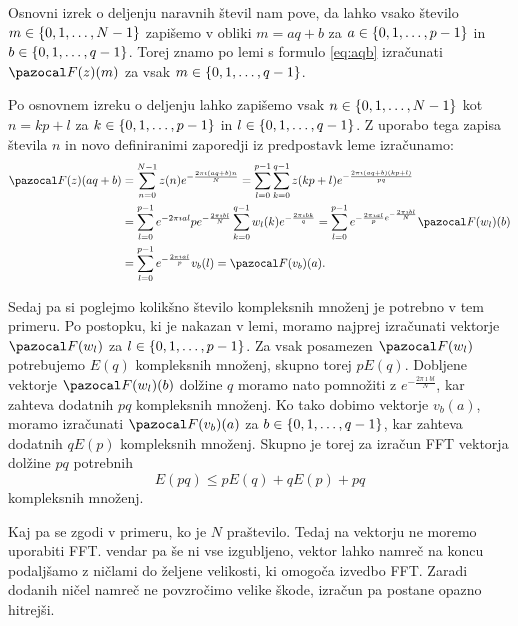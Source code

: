 %
\begin{dokaz}
%
Osnovni izrek o deljenju naravnih števil nam pove, da lahko vsako število $m \in \left\{0, 1, \ldots, N-1\right\}$ zapišemo v obliki $m = aq + b$ za $a \in \left\{0, 1, \ldots, p-1\right\}$ in $b \in \left\{0, 1, \ldots, q-1\right\}$. Torej znamo po lemi s formulo \eqref{eq:aqb} izračunati $\F(z)(m)$ za vsak $m \in \left\{0, 1, \ldots, q-1\right\}$.

Po osnovnem izreku o deljenju lahko zapišemo vsak $n \in \left\{0, 1, \ldots, N-1\right\}$ kot $n = kp + l$ za $k \in \left\{0, 1, \ldots, p-1\right\}$ in $l \in \left\{0, 1, \ldots, q-1\right\}$. Z uporabo tega zapisa števila $n$ in novo definiranimi zaporedji iz predpostavk leme izračunamo:
\begin{align*}
  \F(z)(aq + b) & = \sum_{n=0}^{N-1} z(n) e^{-\frac{2\pi\imath(aq + b)n}{N}} = \sum_{l=0}^{p-1} \sum_{k=0}^{q-1} z(kp + l)e^{-\frac{2\pi\imath(aq + b)(kp + l)}{pq}} \\
  & = \sum_{l=0}^{p-1} e^{-2\pi\imath al}{p} e^{-\frac{2\pi\imath bl}{N}} \sum_{k=0}^{q-1} w_l(k) e^{-\frac{2\pi\imath bk}{q}} = \sum_{l=0}^{p-1} e^{-\frac{2\pi\imath al}{p} e^{-\frac{2\pi\imath bl}{N}}} \F(w_l)(b) \\
  & = \sum_{l=0}^{p-1} e^{-\frac{2\pi\imath al}{p}} v_b(l) = \F(v_b)(a).
\end{align*}
\end{dokaz}
%
Sedaj pa si poglejmo kolikšno število kompleksnih množenj je potrebno v tem primeru. Po postopku, ki je nakazan v lemi, moramo najprej izračunati vektorje $\F(w_l)$ za $l \in \left\{0, 1, \ldots, p-1\right\}$. Za vsak posamezen $\F(w_l)$ potrebujemo $E(q)$ kompleksnih množenj, skupno torej $p E(q)$. Dobljene vektorje $\F(w_l)(b)$ dolžine $q$ moramo nato pomnožiti z $e^{-\frac{2\pi\imath bl}{N}}$, kar zahteva dodatnih $pq$ kompleksnih množenj. Ko tako dobimo vektorje $v_b(a)$, moramo izračunati $\F(v_b)(a)$ za $b \in \left\{0, 1, \ldots, q-1\right\}$, kar zahteva dodatnih $qE(p)$ kompleksnih množenj. Skupno je torej za izračun FFT vektorja dolžine $pq$ potrebnih
\begin{equation}
  E(pq) \leq pE(q) + qE(p) + pq
\end{equation}
kompleksnih množenj.

Kaj pa se zgodi v primeru, ko je $N$ praštevilo. Tedaj na vektorju ne moremo uporabiti FFT. vendar pa še ni vse izgubljeno, vektor lahko namreč na koncu podaljšamo z ničlami do željene velikosti, ki omogoča izvedbo FFT. Zaradi dodanih ničel namreč ne povzročimo velike škode, izračun pa postane opazno hitrejši.

